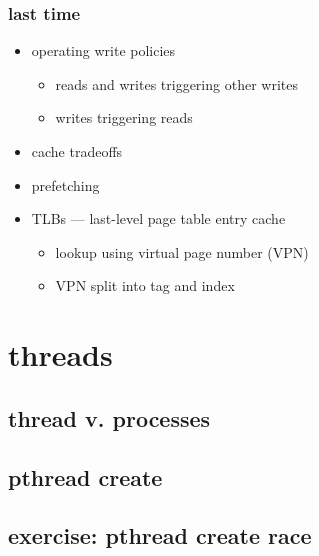\date{}
\title{}
\date{}

\begin{frame}
    \titlepage
\end{frame}





\begin{frame}
\frametitle{last time}
    \begin{itemize}
    \item operating write policies
        \begin{itemize}
        \item reads and writes triggering other writes
        \item writes triggering reads
        \end{itemize}
    \item cache tradeoffs
    \item prefetching
    \item TLBs --- last-level page table entry cache
        \begin{itemize}
        \item lookup using virtual page number (VPN)
        \item VPN split into tag and index
        \end{itemize}
    \end{itemize}
\end{frame}

\section{threads}
\subsection{thread v. processes}



\subsection{pthread create}



\subsection{exercise: pthread create race}



